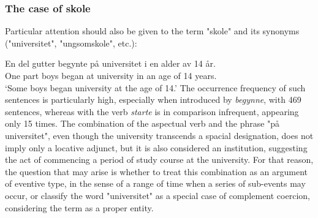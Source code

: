 \documentclass{article}
\begin{document}
\subsubsection{The case of skole}






Particular attention should also be given to the term "skole" and its synonyms ("universitet", "ungsomskole", etc.):
        \ea \label{initiation_skole} %

        \gll En del gutter begynte på universitet i en alder av 14 år.\\
             One part boys began at university in an age of 14 years.\\
        \glt ‘Some boys began university at the age of 14.’
        \z
The occurrence frequency of such sentences is particularly high, especially when introduced by \emph{begynne}, with 469 sentences, whereas with the verb \emph{starte} is in comparison infrequent, appearing only 15 times. 
The combination of the aspectual verb and the phrase "på universitet", even though the university transcends a spacial designation, does not imply only a locative adjunct, but it is also considered an institution, suggesting the act of commencing a period of study course at the university. For that reason, the question that may arise is whether to treat this combination as an argument of eventive type, in the sense of a range of time when a series of sub-events may occur, or classify the word "universitet" as a special case of complement coercion, considering the term as a proper entity.
\end{document}

